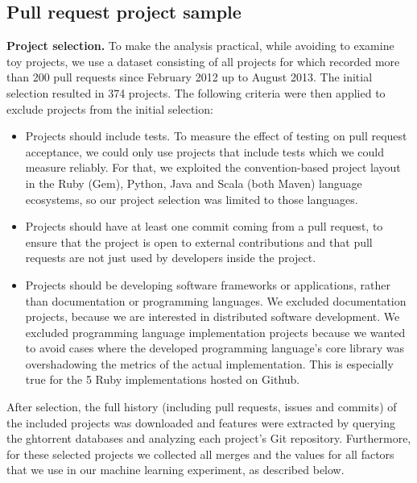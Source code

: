 \documentclass{sig-alternate}
\begin{document}
\subsection{Pull request project sample}
\label{sec:expdata} 

\textbf{Project selection.} To make the analysis practical, while avoiding to examine toy
projects, we use a dataset consisting of all projects for which \ghtorrent
recorded more than 200 pull requests since February 2012 up to August 2013. The initial selection
resulted in 374 projects. The following criteria were then applied to exclude
projects from the initial selection:

\begin{itemize}

  \item Projects should include tests. To measure the effect of testing on pull
    request acceptance, we could only use projects that include tests which we
    could measure reliably. For that, we exploited the convention-based project
    layout in the Ruby (Gem), Python, Java and Scala (both Maven) language
    ecosystems, so our project selection was limited to those languages. 

  \item Projects should have at least one commit coming from a pull request, to
    ensure that the project is open to external contributions and that pull
    requests are not just used by developers inside the project.

  \item Projects should be developing software frameworks or applications,
    rather than documentation or programming languages. We excluded
    documentation projects, because we are interested in distributed software
    development. We excluded programming language implementation projects
    because we wanted to avoid cases where the developed programming language's
    core library was overshadowing the metrics of the actual implementation.
    This is especially true for the 5 Ruby implementations hosted on Github.

\end{itemize}

After selection, the full history (including pull requests, issues and commits)
of the included projects was downloaded and features were extracted by querying
the {\sc ght}orrent databases and analyzing each project's Git repository. 
Furthermore, for these selected projects we collected all merges and the values for all factors that we use in our machine learning experiment, as described below.
\end{document}
